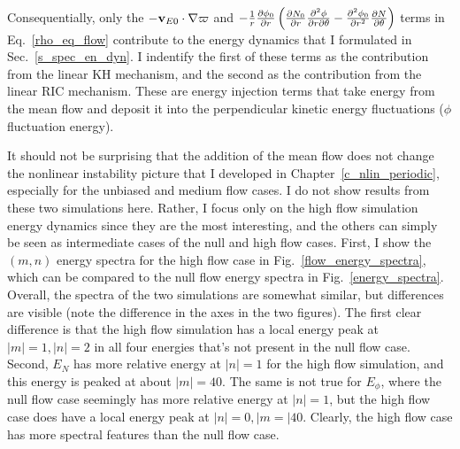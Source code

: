 Consequentially, only the $- {\mathbf v_{E0}} \cdot \nabla \varpi$ and 
$-\frac{1}{r} \frac{\partial\phi_0}{\partial r} \left(\frac{\partial N_0}{\partial r} \frac{\partial^2\phi}{\partial r \partial\theta} - \frac{\partial^2\phi_0}{\partial r^2} \frac{\partial N}{\partial\theta} \right) \nonumber$ terms in Eq.~\ref{rho_eq_flow} contribute to the energy
dynamics that I formulated in Sec.~\ref{s_spec_en_dyn}. I indentify the first of these terms as the contribution from the linear KH mechanism, and the second as the contribution from the
linear RIC mechanism. These are energy injection terms that take energy from the mean flow and deposit it into the perpendicular kinetic energy fluctuations ($\phi$ fluctuation energy).

It should not be surprising that the addition of the mean flow does not change the nonlinear instability picture that I developed in Chapter~\ref{c_nlin_periodic}, especially for the unbiased
and medium flow cases. I do not show results from these two simulations here. Rather, I focus only on the high flow simulation energy dynamics since they are the most interesting,
and the others can simply be seen as intermediate cases of the null and high flow cases. First, I show the $(m,n)$ energy spectra for the high flow case in Fig.~\ref{flow_energy_spectra},
which can be compared to the null flow energy spectra in Fig.~\ref{energy_spectra}. Overall, the spectra of the two simulations are somewhat similar, but differences are visible (note
the difference in the axes in the two figures).
The first clear difference is that the high flow simulation has a local energy peak at $|m|=1,|n|=2$ in all four energies that's not present in the null flow case. 
Second, $E_N$ has more relative energy at $|n|=1$ for the high flow simulation, and this energy
is peaked at about $|m|=40$. The same is not true for $E_\phi$, where the null flow case seemingly has more relative energy at $|n|=1$, but the high flow case does have a local energy peak at
$|n|=0,|m=|40$. Clearly, the high flow case has more spectral features than the null flow case.

